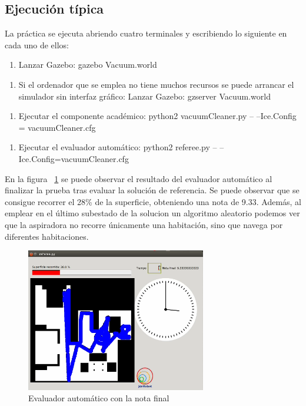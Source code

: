 \subsection{Ejecución típica}
La práctica se ejecuta abriendo cuatro terminales y escribiendo lo siguiente en cada uno de ellos: 
\begin{enumerate}[1.]
    \item Lanzar Gazebo: gazebo Vacuum.world
\end{enumerate}
\begin{enumerate}[1b.]
\item Si el ordenador que se emplea no tiene muchos recursos se puede arrancar el simulador sin interfaz gráfico: Lanzar Gazebo: gzserver Vacuum.world
\end{enumerate}
\begin{enumerate}[2.]
    \item Ejecutar el componente académico: python2 vacuumCleaner.py -- --Ice.Config = vacuumCleaner.cfg
\end{enumerate}
\begin{enumerate}[3.]
  	\item Ejecutar el evaluador automático: python2 referee.py -- --Ice.Config=vacuumCleaner.cfg
 \end{enumerate}

En la figura ~\ref{fig.Referee_Roomba} se puede observar el resultado del evaluador automático al finalizar la prueba tras evaluar la solución de referencia. Se puede observar que se consigue recorrer el 28\% de  la superficie, obteniendo una nota de 9.33. Además, al emplear en el último subestado de la solucion un algoritmo aleatorio podemos ver que la aspiradora no recorre únicamente una habitación, sino que navega por diferentes habitaciones.

\begin{figure}[H]
  \begin{center}
    \includegraphics[width=0.7\textwidth]{figures/Vacuum/Referee_Roomba.png}
		\caption{Evaluador automático con la nota final}
		\label{fig.Referee_Roomba}
		\end{center}
\end{figure}

